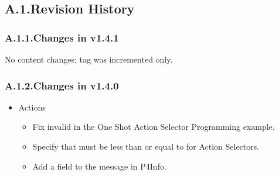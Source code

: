 \documentclass[11pt]{article}
\begin{document}
{%
\subsection{A.1.\hspace*{0.5em}Revision History}\label{sec-revision-history}%

\subsubsection{A.1.1.\hspace*{0.5em}Changes in v1.4.1}\label{sec-changes-in-v141}%

\noindent{}No content changes; tag was incremented only.%

\subsubsection{A.1.2.\hspace*{0.5em}Changes in v1.4.0}\label{sec-changes-in-v140}%

\begin{itemize}%

\item{}
Actions%

\begin{itemize}[noitemsep,topsep=\mdcompacttopsep]%

\item{}Fix invalid  in the One Shot Action Selector Programming
example.%

\item{}Specify that  must be less than or equal to  for
Action Selectors.%

\item{}Add a  field to the  message
in P4Info.%
\end{itemize}%


\end{itemize}}
\end{document}
